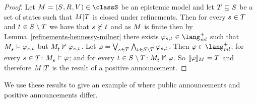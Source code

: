 \begin{proof}
Let $\kModelAndTuple \in \classS$ be an epistemic model and
let $\kStatesT \subseteq \kStates$ be a set of states such that $\restrict{\kModel}{\kStatesT}$ is closed under refinements.
Then for every $\kStateS \in \kStatesT$ and $\kStateT \in \kStates \setminus \kStatesT$ we have that $\kStateS \not\simulates \kStateT$ and as $\kModel$ is finite then by Lemma~\ref{refinements-hennessy-milner} there exists $\phi_{\kStateS,\kStateT} \in \langMlPlus$ such that $\kPModel{\kStateS} \entails \phi_{\kStateS,\kStateT}$ but $\kPModel{\kStateT} \nentails \phi_{\kStateS,\kStateT}$.
Let $\phi = \bigvee_{\kStateS \in \kStatesT} \bigwedge_{\kStateT \in \kStates \setminus \kStatesT} \phi_{\kStateS, \kStateT}$.
Then $\phi \in \langMlPlus$; 
for every $\kStateS \in \kStatesT$: $\kPModel{\kStateS} \entails \phi$; 
and for every $\kStateT \in \kStates \setminus \kStatesT$: $\kPModel{\kStateT} \nentails \phi$.
So $\interpretation[\kModel]{\phi} = \kStatesT$ and therefore $\restrict{\kModel}{\kStatesT}$ is the result of a positive announcement.
\end{proof}

We use these results to give an example of where public announcements and positive announcements differ.

